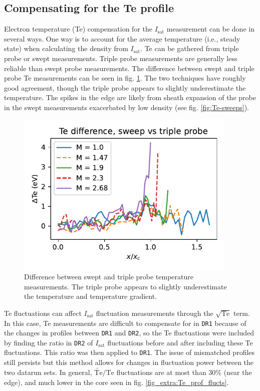 \subsection{Compensating for the Te profile}

Electron temperature (Te) compensation for the $I_\text{sat}$ measurement can be done in several ways. One way is to account for the average temperature (i.e., steady state) when calculating the density from $I_\text{sat}$. Te can be gathered from triple probe or swept measurements. Triple probe measurements are generally less reliable than swept probe measurements. The difference between swept and triple probe Te measurements can be seen in fig. \ref{fig:Te_swept_vs_triple}. The two techniques have roughly good agreement, though the triple probe appears to slightly underestimate the temperature. The spikes in the edge are likely from sheath expansion of the probe in the swept measurements exacerbated by low density \cite{tsui_accounting_2018} (see fig. \ref{fig:Te-sweeps}). 

\begin{figure}
    \centering
    \includegraphics[width=300pt]{figures/Te_sweep-TP_diff.pdf}
    \caption[Swept vs triple probe measurements]{Difference between swept and triple probe temperature measurements. The triple probe appears to slightly underestimate the temperature and temperature gradient. }
    \label{fig:Te_swept_vs_triple}
\end{figure}

Te fluctuations can affect $I_\text{sat}$ fluctuation measurements through the $\sqrt{\text{Te}}$ term. In this case, Te measurements are difficult to compensate for in \texttt{DR1} because of the changes in profiles between \texttt{DR1} and \texttt{DR2}, so the Te fluctuations were included by finding the ratio in \texttt{DR2} of $I_\text{sat}$ fluctuations before and after including these Te fluctuations. This ratio was then applied to \texttt{DR1}. The issue of mismatched profiles still persists but this method allows for changes in fluctuation power between the two datarun sets. In general, $\widetilde{\text{Te}} / \text{Te}$ fluctuations are at most than 30\% (near the edge), and much lower in the core seen in fig. \ref{fig_extra:Te_prof_flucts}. 


